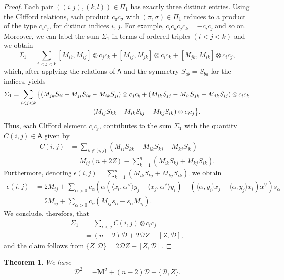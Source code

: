 \documentclass[pdftex]{sigma}
\numberwithin{equation}{section}
\newtheorem{Theorem}{Theorem}[section]
\begin{document}
\begin{proof}
Each pair $((i,j),(k,l)) \in \Pi_1$ has exactly three distinct entries. Using the Clifford relations, each product $c_\pi c_\sigma$ with $(\pi,\sigma)\in\Pi_1$ reduces to a product of the type $c_ic_j$, for distinct indices $i$, $j$. For example, $c_ic_kc_jc_k = -c_ic_j$ and so on.
Moreover, we can label the sum $\Sigma_1$ in terms of ordered triples $(i<j<k)$ and we obtain
\begin{equation*}
 \Sigma_1 = \sum_{i<j<k} [M_{ik},M_{ij}]\otimes c_jc_k +
 [M_{ij},M_{jk}]\otimes c_ic_k + [M_{jk},M_{ik}]\otimes c_ic_j,
\end{equation*}
which, after applying the relations of $\mathsf{A}$ and the symmetry $S_{ab} = S_{ba}$ for the indices, yields
\begin{gather*}
\Sigma_1 = \sum_{i<j<k}\big\{(M_{jk}S_{ii} - M_{ji}S_{ik} - M_{ik}S_{ji})\otimes c_jc_k
+ (M_{ik}S_{jj} - M_{ij}S_{jk} - M_{jk}S_{ij})\otimes c_ic_k \\
\hphantom{\Sigma_1 = \sum_{i<j<k}}{}
 + (M_{ij}S_{kk} - M_{ik}S_{kj} - M_{kj}S_{ik})\otimes c_ic_j\big\}.
\end{gather*}
Thus, each Clifford element $c_ic_j$, contributes to the sum $\Sigma_1$ with the quantity $C(i,j)\in\mathsf{A}$ given by
\begin{align*}
C(i,j) &= \sum_{k\notin\{i,j\}} (M_{ij}S_{kk} - M_{ik}S_{kj} - M_{kj}S_{ik})\\
&= M_{ij}(n+2Z) - \sum_{k=1}^n (M_{ik}S_{kj} + M_{kj}S_{ik}).
\end{align*}
Furthermore, denoting $\epsilon(i,j) = \sum_{k=1}^n (M_{ik}S_{kj} + M_{kj}S_{ik})$, we obtain
\begin{align*}
 \epsilon(i,j) &= 2M_{ij} +
 \sum_{\alpha>0}c_\alpha (\alpha(\langle x_i,\alpha^\vee\rangle y_j - \langle x_j,\alpha^\vee\rangle y_i) - (\langle\alpha,y_i\rangle x_j - \langle\alpha,y_j\rangle x_i)\alpha^\vee)s_\alpha\\
 &= 2M_{ij} + \sum_{\alpha>0}c_\alpha(M_{ij}s_\alpha - s_\alpha M_{ij}).
\end{align*}
We conclude, therefore,
that
\begin{align*}
 \Sigma_1 &= \sum_{i<j}C(i,j)\otimes c_ic_j\\
 &=(n-2)\mathcal{D} + 2\mathcal{D}Z + [Z,\mathcal{D}],
\end{align*}
and the claim follows from $\{Z,\mathcal{D}\} = 2\mathcal{D}Z + [Z,\mathcal{D}]$.
\end{proof}

\begin{Theorem}
We have
\[
\mathcal{D}^2 = -\mathbf{M}^2 + (n-2)\mathcal{D} + \{\mathcal{D},Z\}.
\]
\end{Theorem}
\end{document}
